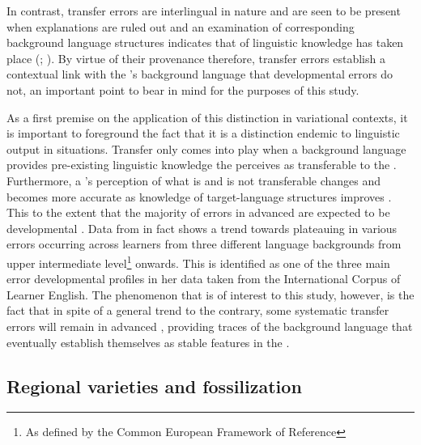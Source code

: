 \documentclass[output=paper]{langsci/langscibook}
\begin{document}
In contrast, transfer errors are interlingual in nature and are seen
to be present when  explanations are ruled out and an
examination of corresponding background language structures indicates that
 of linguistic knowledge has taken place
(\citealt{Lado1957}; \citealt{Wardaugh1975}). By virtue of their
provenance therefore, transfer errors establish a contextual link with
the ’s background language that developmental errors do not, an
important point to bear in mind for the purposes of this study.

As a first premise on the application of this distinction in
variational contexts, it is important to foreground the fact that it
is a distinction endemic to linguistic output in 
situations. Transfer only comes into play when a background language
provides pre-existing linguistic knowledge the  perceives as
transferable to the . Furthermore, a ’s
perception of what is and is not transferable changes and becomes more
accurate as knowledge of target-language structures improves
\citep{Taylor1975}. This to the extent that the majority of errors in
advanced  are expected to be developmental
\citep{McLaughlin1987}. Data from \citet{Thewissen2013} in fact
shows a trend towards plateauing in various errors occurring across
learners from three different language backgrounds from upper
intermediate level\footnote{As defined by the Common European
  Framework of Reference} onwards. This is identified as one of the
three main error developmental profiles in her data taken from the
International Corpus of Learner English. The phenomenon that is of
interest to this study, however, is the fact that in spite of a
general trend to the contrary, some systematic transfer errors will
remain in advanced , providing traces of the background
language that eventually establish themselves as stable features in
the  \citep{Selinker1974}.

\subsection{Regional varieties and fossilization}
\end{document}
